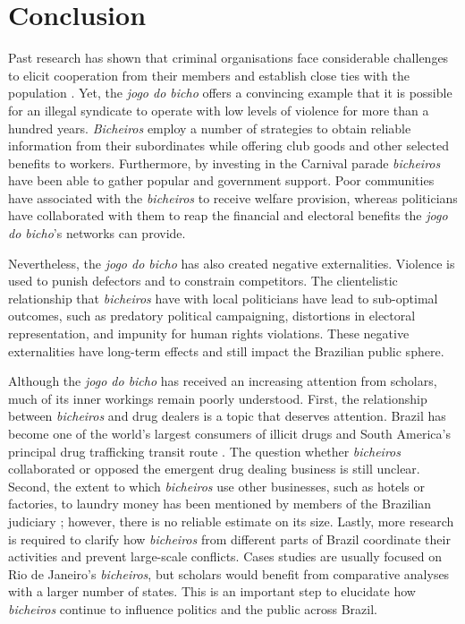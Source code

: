 \section{Conclusion}
\label{sec:conclusion3}

Past research has shown that criminal organisations face considerable challenges to elicit cooperation from their members and establish close ties with the population \citep[e.g.][]{gambetta1996sicilian,skarbek2011governance,skarbek2012prison,varese2001russian,varese2011mafias}. Yet, the \emph{jogo do bicho} offers a convincing example that it is possible for an illegal syndicate to operate with low levels of violence for more than a hundred years. \emph{Bicheiros} employ a number of strategies to obtain reliable information from their subordinates while offering club goods and other selected benefits to workers. Furthermore, by investing in the Carnival parade \emph{bicheiros} have been able to gather popular and government support. Poor communities have associated with the \emph{bicheiros} to receive welfare provision, whereas politicians have collaborated with them to reap the financial and electoral benefits the \emph{jogo do bicho}'s networks can provide.

Nevertheless, the \emph{jogo do bicho} has also created negative externalities. Violence is used to punish defectors and to constrain competitors. The clientelistic relationship that \emph{bicheiros} have with local politicians have lead to sub-optimal outcomes, such as predatory political campaigning, distortions in electoral representation, and impunity for human rights violations. These negative externalities have long-term effects and still impact the Brazilian public sphere.

Although the \emph{jogo do bicho} has received an increasing attention from scholars, much of its inner workings remain poorly understood. First, the relationship between \emph{bicheiros} and drug dealers is a topic that deserves attention. Brazil has become one of the world's largest consumers of illicit drugs and South America's principal drug trafficking transit route \citep{miraglia2015drugs,misse2011crime}. The question whether \emph{bicheiros} collaborated or opposed the emergent drug dealing business is still unclear. Second, the extent to which \emph{bicheiros} use other businesses, such as hotels or factories, to laundry money has been mentioned by members of the Brazilian judiciary \citep{globo2012bicheiro,globo2015cacaniquel}; however, there is no reliable estimate on its size. Lastly, more research is required to clarify how \emph{bicheiros} from different parts of Brazil coordinate their activities and prevent large-scale conflicts. Cases studies are usually focused on Rio de Janeiro's \emph{bicheiros}, but scholars would benefit from comparative analyses with a larger number of states. This is an important step to elucidate how \emph{bicheiros} continue to influence politics and the public across Brazil.

